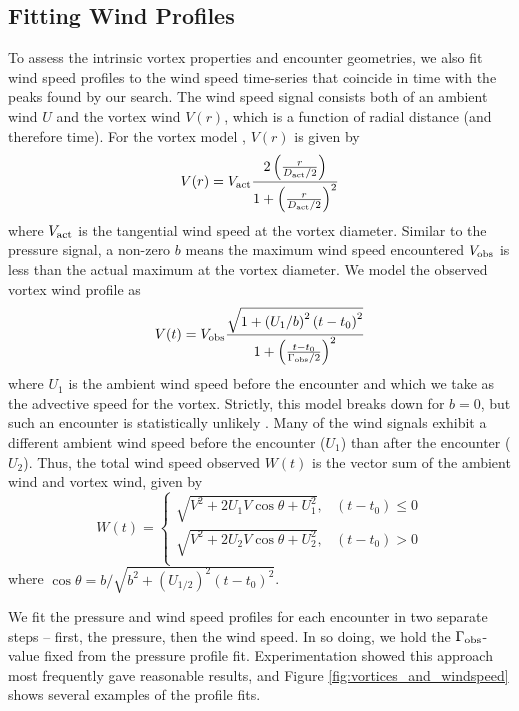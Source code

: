 \documentclass[linenumbers,trackchanges]{aastex63}
\begin{document}
\subsection{Fitting Wind Profiles}
\label{sec:Fitting Wind Profiles}
To assess the intrinsic vortex properties and encounter geometries, we also fit wind speed profiles to the wind speed time-series that coincide in time with the peaks found by our search. The wind speed signal consists both of an ambient wind $U$ and the vortex wind $V(r)$, which is a function of radial distance (and therefore time). For the  vortex model \citep{1991ExFl...11...73V}, $V(r)$ is given by
\begin{equation}
    V(r) = V_{\rm act} \frac{2 \left( \frac{r}{D_{\rm act}/2} \right) }{1 + \left( \frac{r}{D_{\rm act}/2} \right)^2}
\end{equation}
where $V_{\rm act}$ is the tangential wind speed at the vortex diameter. Similar to the pressure signal, a non-zero $b$ means the maximum wind speed encountered $V_{\rm obs}$ is less than the actual maximum at the vortex diameter. We model the observed vortex wind profile as
\begin{equation}
    V(t) = V_{\rm obs} \frac{\sqrt{1 + \left( U_1/b \right)^2 \left( t - t_0 \right)^2}}{1 + \left(\frac{t - t_0}{\Gamma_{\rm obs}/2}\right)^2}\label{eqn:wind_profile}
\end{equation}
where $U_1$ is the ambient wind speed before the encounter and which we take as the advective speed for the vortex. Strictly, this model breaks down for $b = 0$, but such an encounter is statistically unlikely \citep{2018Icar..299..166J}. Many of the wind signals exhibit a different ambient wind speed before the encounter ($U_1$) than after the encounter ($U_2$). Thus, the total wind speed observed $W(t)$ is the vector sum of the ambient wind and vortex wind, given by 
\begin{equation}
    W(t) = \left\{
    \begin{array}{ll}
            \sqrt{V^2 + 2 U_1 V \cos \theta + U_1^2}, & \left( t - t_0 \right) \leq 0\\
            \sqrt{V^2 + 2 U_2 V \cos \theta + U_2^2}, & \left( t - t_0 \right) > 0\\
    \end{array} \label{eqn:total_wind_speed}
\end{equation}
where $\cos \theta = b/\sqrt{b^2 + \left( U_{1/2} \right)^2\left( t - t_0 \right)^2}$. 

We fit the pressure and wind speed profiles for each encounter in two separate steps -- first, the pressure, then the wind speed. In so doing, we hold the $\Gamma_{\rm obs}$-value fixed from the pressure profile fit. Experimentation showed this approach most frequently gave reasonable results, and Figure \ref{fig:vortices_and_windspeed} shows several examples of the profile fits. 
\end{document}
